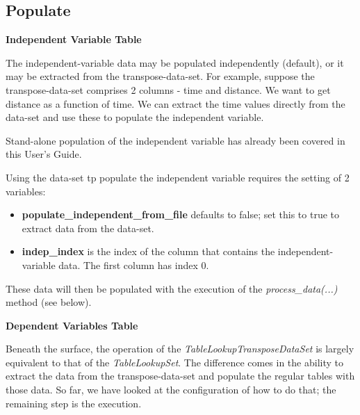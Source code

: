 \documentclass[11pt,fleqn]{report}
\begin{document}
\subsection{Populate}\label{UG:transpose_data_set:populate}
\textbf{Independent Variable Table}

The independent-variable data may be populated independently (default), or it
may be extracted from the transpose-data-set.  For example, suppose the
transpose-data-set comprises 2 columns - time and distance.  We want to get
distance as a function of time.  We can extract the time values directly from
the data-set and use these to populate the independent variable.

Stand-alone population of the independent variable has already been covered
in this User's Guide.

Using the data-set tp populate the independent variable requires the setting
of 2 variables:
\begin{itemize}
 \item \textbf{populate\_independent\_from\_file} defaults to false; set this
       to true to extract data from the data-set.
 \item \textbf{indep\_index} is the index of the column that contains the
       independent-variable data.  The first column has index 0.
\end{itemize}

These data will then be populated with the execution of the
\textit{process\_data(...)} method (see below).

\textbf{Dependent Variables Table}

Beneath the surface, the operation of the \textit{TableLookupTransposeDataSet}
is largely equivalent to that of the \textit{TableLookupSet}.  The difference
comes in the ability to extract the data from the transpose-data-set and
populate the regular tables with those data.  So far, we have looked at the
configuration of how to do that; the remaining step is the execution.
\end{document}
